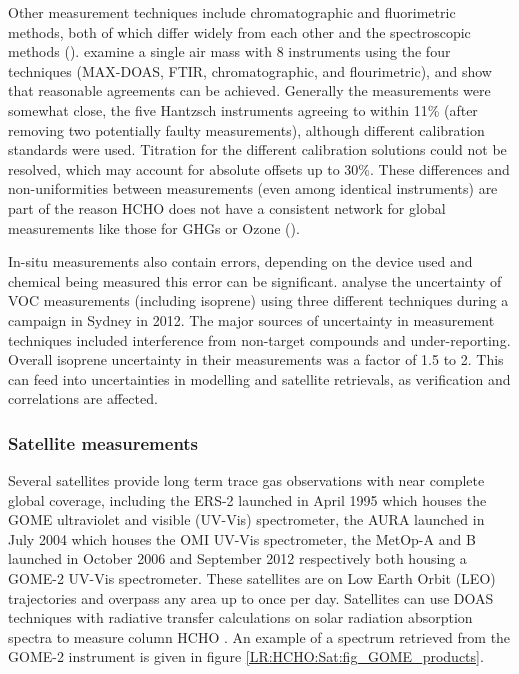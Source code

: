     Other measurement techniques include chromatographic and fluorimetric methods, both of which differ widely from each other and the spectroscopic methods (\cite{Hak2005}).
    \cite{Hak2005} examine a single air mass with 8 instruments using the four techniques (MAX-DOAS, FTIR, chromatographic, and flourimetric), and show that reasonable agreements can be achieved.
    Generally the measurements were somewhat close, the five Hantzsch instruments agreeing to within 11\% (after removing two potentially faulty measurements), although different calibration standards were used.
    Titration for the different calibration solutions could not be resolved, which may account for absolute offsets up to 30\%.
    These differences and non-uniformities between measurements (even among identical instruments) are part of the reason HCHO does not have a consistent network for global measurements like those for GHGs or Ozone (\cite{FortemsCheiney2012}).
  
    In-situ measurements also contain errors, depending on the device used and chemical being measured this error can be significant.
    \cite{Dunne2017} analyse the uncertainty of VOC measurements (including isoprene) using three different techniques during a campaign in Sydney in 2012.
    The major sources of uncertainty in measurement techniques included interference from non-target compounds and under-reporting.
    Overall isoprene uncertainty in their measurements was a factor of 1.5 to 2.
    This can feed into uncertainties in modelling and satellite retrievals, as verification and correlations are affected.
  
  \subsubsection{Satellite measurements}
  \label{LR:HCHO:Sat}
    
    Several satellites provide long term trace gas observations with near complete global coverage, including the ERS-2 launched in April 1995 which houses the GOME ultraviolet and visible (UV-Vis) spectrometer, the AURA launched in July 2004 which houses the OMI UV-Vis spectrometer, the MetOp-A and B launched in October 2006 and September 2012 respectively both housing a GOME-2 UV-Vis spectrometer.
    These satellites are on Low Earth Orbit (LEO) trajectories and overpass any area up to once per day.
    Satellites can use DOAS techniques with radiative transfer calculations on solar radiation absorption spectra to measure column HCHO .
    An example of a spectrum retrieved from the GOME-2 instrument is given in figure \ref{LR:HCHO:Sat:fig_GOME_products}.
    
